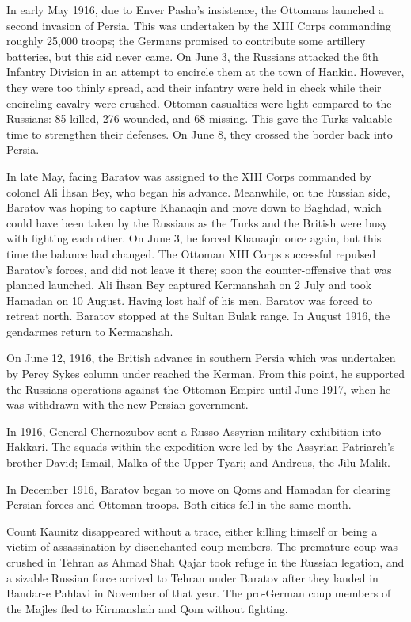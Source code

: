 \documentclass[a4paper,]{book}
\begin{document}
In early May 1916, due to Enver Pasha's insistence, the Ottomans launched a second invasion of Persia. This was undertaken by the XIII Corps commanding roughly 25,000 troops; the Germans promised to contribute some artillery batteries, but this aid never came. On June 3, the Russians attacked the 6th Infantry Division in an attempt to encircle them at the town of Hankin. However, they were too thinly spread, and their infantry were held in check while their encircling cavalry were crushed. Ottoman casualties were light compared to the Russians: 85 killed, 276 wounded, and 68 missing. This gave the Turks valuable time to strengthen their defenses. On June 8, they crossed the border back into Persia.

In late May, facing Baratov was assigned to the XIII Corps commanded by colonel Ali İhsan Bey, who began his advance. Meanwhile, on the Russian side, Baratov was hoping to capture Khanaqin and move down to Baghdad, which could have been taken by the Russians as the Turks and the British were busy with fighting each other. On June 3, he forced Khanaqin once again, but this time the balance had changed. The Ottoman XIII Corps successful repulsed Baratov's forces, and did not leave it there; soon the counter-offensive that was planned launched. Ali İhsan Bey captured Kermanshah on 2 July and took Hamadan on 10 August. Having lost half of his men, Baratov was forced to retreat north. Baratov stopped at the Sultan Bulak range. In August 1916, the gendarmes return to Kermanshah.

On June 12, 1916, the British advance in southern Persia which was undertaken by Percy Sykes column under reached the Kerman. From this point, he supported the Russians operations against the Ottoman Empire until June 1917, when he was withdrawn with the new Persian government.

In 1916, General Chernozubov sent a Russo-Assyrian military exhibition into Hakkari. The squads within the expedition were led by the Assyrian Patriarch's brother David; Ismail, Malka of the Upper Tyari; and Andreus, the Jilu Malik.

In December 1916, Baratov began to move on Qoms and Hamadan for clearing Persian forces and Ottoman troops. Both cities fell in the same month.

Count Kaunitz disappeared without a trace, either killing himself or being a victim of assassination by disenchanted coup members. The premature coup was crushed in Tehran as Ahmad Shah Qajar took refuge in the Russian legation, and a sizable Russian force arrived to Tehran under Baratov after they landed in Bandar-e Pahlavi in November of that year. The pro-German coup members of the Majles fled to Kirmanshah and Qom without fighting. 
\end{document}
